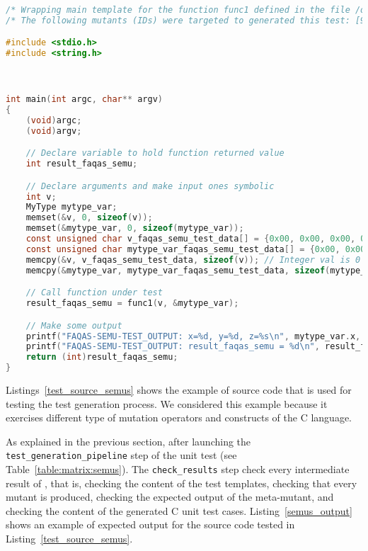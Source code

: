 \begin{lstlisting}[language=C, label=semus_output, caption=SEMuS output.]
/* Wrapping main template for the function func1 defined in the file /opt/faqas_semu/case_studies/tests/WORKSPACE/DOWNLOADED/src.c */
/* The following mutants (IDs) were targeted to generated this test: [9] */

#include <stdio.h>
#include <string.h>



int main(int argc, char** argv)
{
    (void)argc;
    (void)argv;

    // Declare variable to hold function returned value
    int result_faqas_semu;

    // Declare arguments and make input ones symbolic
    int v;
    MyType mytype_var;
    memset(&v, 0, sizeof(v));
    memset(&mytype_var, 0, sizeof(mytype_var));
    const unsigned char v_faqas_semu_test_data[] = {0x00, 0x00, 0x00, 0x00};
    const unsigned char mytype_var_faqas_semu_test_data[] = {0x00, 0x00, 0x00, 0x00, 0x00, 0x00, 0x00, 0x00, 0x00, 0x00, 0x00, 0x00, 0x00, 0x00, 0x00, 0x00};
    memcpy(&v, v_faqas_semu_test_data, sizeof(v)); // Integer val is 0
    memcpy(&mytype_var, mytype_var_faqas_semu_test_data, sizeof(mytype_var));

    // Call function under test
    result_faqas_semu = func1(v, &mytype_var);

    // Make some output
    printf("FAQAS-SEMU-TEST_OUTPUT: x=%d, y=%d, z=%s\n", mytype_var.x, mytype_var.y, mytype_var.z);
    printf("FAQAS-SEMU-TEST_OUTPUT: result_faqas_semu = %d\n", result_faqas_semu);
    return (int)result_faqas_semu;
}
\end{lstlisting}

Listings~\ref{test_source_semus} shows the example of source code that is used for testing the test generation process. We considered this example because it exercises different type of mutation operators and constructs of the C language.

As explained in the previous section, after launching the \texttt{test\_generation\_pipeline} step of the unit test (see Table~\ref{table:matrix:semus}). The \texttt{check\_results} step check every intermediate result of \SEMUS, that is, checking the content of the test templates, checking that every mutant is produced, checking the expected output of the meta-mutant, and checking the content of the generated C unit test cases. Listing~\ref{semus_output} shows an example of expected output for the source code tested in Listing~\ref{test_source_semus}.
